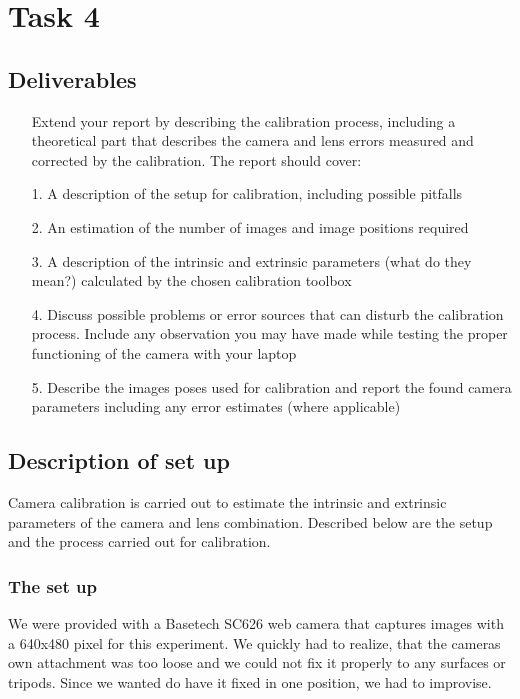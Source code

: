 

    \chapter{Task 4}
    \section{Deliverables }
    \begin{itemize}
        \item[] Extend your report by describing the calibration process, including a theoretical part that describes the camera and lens errors measured and corrected by the calibration. The report should cover:
    \end{itemize}
    
    \begin{itemize}
        \item[1.] A description of the setup for calibration, including possible pitfalls
        \item[2.] An estimation of the number of images and image positions required
        \item[3.] A description of the intrinsic and extrinsic parameters (what do they mean?) calculated by the chosen calibration toolbox
        \item[4.] Discuss possible problems or error sources that can disturb the calibration process. Include any observation you may have made while testing the proper functioning of the camera with your laptop
        \item[5.] Describe the images poses used for calibration and report the found camera parameters including any error estimates (where applicable)
    \end{itemize}
    
    \section{Description of set up}
    
    Camera calibration is carried out to estimate the intrinsic and extrinsic parameters of the camera and lens combination. Described below are the setup and the process carried out for calibration.
    
    \subsection{The set up}
  We were provided with a Basetech SC626 web camera that captures images with a 640x480 pixel for this experiment.
  We quickly had to realize, that the cameras own attachment was too loose and we could not fix it properly to any surfaces or tripods. Since we wanted do have it fixed in one position, we had to improvise.
     
